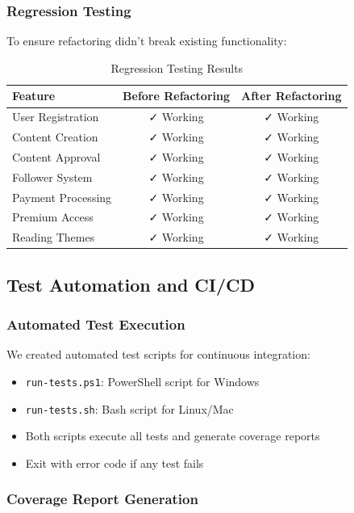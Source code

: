 \subsubsection{Regression Testing}

To ensure refactoring didn't break existing functionality:

\begin{table}[h]
\centering
\begin{tabular}{|l|c|c|}
\hline
\textbf{Feature} & \textbf{Before Refactoring} & \textbf{After Refactoring} \\
\hline
User Registration & ✓ Working & ✓ Working \\
Content Creation & ✓ Working & ✓ Working \\
Content Approval & ✓ Working & ✓ Working \\
Follower System & ✓ Working & ✓ Working \\
Payment Processing & ✓ Working & ✓ Working \\
Premium Access & ✓ Working & ✓ Working \\
Reading Themes & ✓ Working & ✓ Working \\
\hline
\end{tabular}
\caption{Regression Testing Results}
\label{tab:regression}
\end{table}

\subsection{Test Automation and CI/CD}

\subsubsection{Automated Test Execution}

We created automated test scripts for continuous integration:

\begin{itemize}
    \item \texttt{run-tests.ps1}: PowerShell script for Windows
    \item \texttt{run-tests.sh}: Bash script for Linux/Mac
    \item Both scripts execute all tests and generate coverage reports
    \item Exit with error code if any test fails
\end{itemize}

\subsubsection{Coverage Report Generation}

